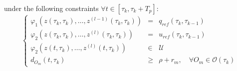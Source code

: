 \documentclass[eprint]{actapoly}
\begin{document}
under the following constraints $\forall t \in [\tau_k, \tau_k+T_p]$:
\begin{equation}%
\left\lbrace\begin{array}{lcl}
	\varphi_1(z(\tau_{k},\tau_{k}),\dotsc,z^{(l-1)}(\tau_k,\tau_k)) & = & q_{ref}(\tau_k,\tau_{k-1})\\
    \varphi_2(z(\tau_{k},\tau_{k}),\dotsc,z^{(l)}(\tau_k,\tau_k)) & = & u_{ref}(\tau_k,\tau_{k-1})\\
    \varphi_2(z(t,\tau_k),\dotsc,z^{(l)}(t,\tau_k)) &\in& \mathcal{U}\\
    d_{O_m}(t,\tau_k) &\geq& \rho + r_m,\quad \forall O_m \in \mathcal{O}(\tau_k)
\end{array}\right.
\end{equation}









\end{document}
